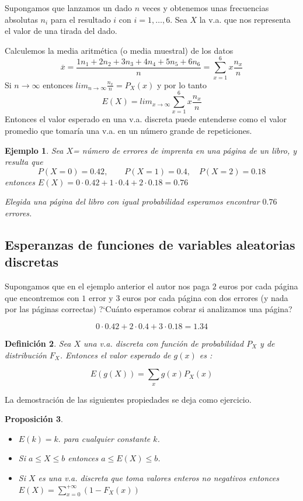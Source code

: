 \documentclass[12pt]{report}
\newtheorem{definition}{Definici\'on}
\newtheorem{proposition}[definition]{Proposici\'on}
\newtheorem{example}[definition]{Ejemplo}
\begin{document}
Supongamos que lanzamos un dado $n$ veces y obtenemos unas frecuencias absolutas $n_{i}$
para el resultado $i$ con $i=1,\ldots,6$. Sea $X$ la v.a. que nos representa el valor de
una tirada del dado.

Calculemos la media aritmética (o media muestral) de los datos
$$\overline{x}=\frac{1 n_{1}+2 n_{2}+3 n_{3}+4 n_{4}+5 n_{5}+6
n_{6}}{n}=\sum_{x=1}^{6} x \frac{n_{x}}{n}$$ Si $n\to \infty$ entonces $lim_{n\to \infty}
\frac{n_{x}}{n}=P_{X}(x)$ y por lo tanto
$$E(X)=lim_{x\to\infty}\sum_{x=1}^{6}x \frac{n_{x}}{n}$$
Entonces el valor esperado en una v.a. discreta puede entenderse como el valor promedio que
tomaría una v.a. en un número grande de repeticiones.


\begin{example}
    Sea $X$= número  de errores de imprenta en una página de un libro,
    y resulta que
    $$P(X=0)=0.42,\qquad P(X=1)=0.4,\quad P(X=2)=0.18$$
    entonces
    $E(X)=0\cdot 0.42+ 1\cdot 0.4 + 2 \cdot 0.18=0.76$

    Elegida una página del libro con igual probabilidad esperamos encontrar $0.76$
    errores.
\end{example}


\subsection{Esperanzas de funciones de variables aleatorias
discretas}

Supongamos que en el ejemplo anterior el autor nos paga $2$ euros por cada página que
encontremos con $1$ error y $3$ euros por cada página con  dos errores (y nada por las
páginas correctas) ?`Cuánto esperamos cobrar si analizamos una página?

$$0\cdot 0.42 + 2\cdot 0.4 + 3\cdot 0.18=1.34$$


\begin{definition}
Sea $X$ una v.a. discreta con función de probabilidad $P_{X}$ y de distribución
$F_{X}$. Entonces el valor esperado de $g(x)$ es :

$$E(g(X))=\sum_{x}g(x) P_{X}(x)$$
\end{definition}

La demostración de las siguientes propiedades se deja como ejercicio.

\begin{proposition}

\begin{itemize}
\item $E(k)=k.$ para cualquier constante $k$.
\item Si $a\leq X\leq b$ entonces $a\leq E(X)\leq b$.
\item Si $X$ es una v.a. discreta que toma valores enteros no negativos entonces
$E(X)=\sum_{x=0}^{+\infty}(1- F_X(x))$
\end{itemize}
\end{proposition}
\end{document}
